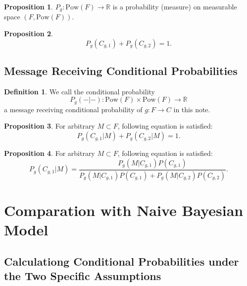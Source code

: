 \documentclass[11pt, a4note]{article}
\theoremstyle{definition}
\newtheorem{definition}{Definition}[section]
\newtheorem{proposition}{Proposition}[section]
\begin{document}
\begin{proposition}
$ P_{g} : \mathrm{Pow}(F) \to \mathbb{R} $ is a probability (measure) on measurable space $ (F, \mathrm{Pow}(F)) $.
\end{proposition}

\begin{proposition}
\begin{equation}
P_{g}(C_{g,1}) + P_{g}(C_{g,2}) = 1.
\end{equation}
\end{proposition}

\subsection{Message Receiving Conditional Probabilities}

\begin{definition}
We call the conditional probability 
\begin{equation}
P_{g}(-|-): \mathrm{Pow}(F) \times \mathrm{Pow}(F) \to \mathbb{R}
\end{equation}
a message receiving conditional probability of $ g : F \to C $ in this note.
\end{definition}

\begin{proposition}
For arbitrary $ M \subset F $, following equation is satisfied:
\begin{equation}
P_{g}(C_{g,1}|M) + P_{g}(C_{g,2}|M) = 1.
\end{equation}
\end{proposition}

\begin{proposition}
For arbitrary $ M \subset F $, following equation is satisfied:
\begin{equation}
P_{g}(C_{g,1}|M) = \frac{P_{g}(M|C_{g,1})P(C_{g,1})}{P_{g}(M|C_{g,1})P(C_{g,1}) + P_{g}(M|C_{g,2})P(C_{g,2})}.
\end{equation}
\end{proposition}

\section{Comparation with Naive Bayesian Model}

\subsection{Calculationg Conditional Probabilities under the Two Specific Assumptions}
\end{document}
